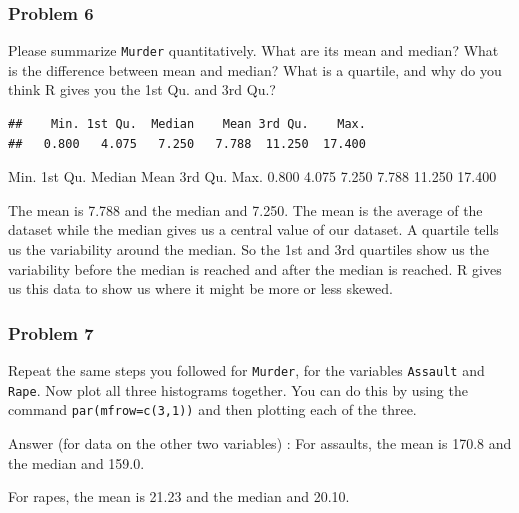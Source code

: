 \documentclass[
]{article}
\newenvironment{Shaded}{\begin{snugshade}}{\end{snugshade}}
\newcommand{\FunctionTok}[1]{\textcolor[rgb]{0.00,0.00,0.00}{#1}}
\newcommand{\NormalTok}[1]{#1}
\newcommand{\SpecialCharTok}[1]{\textcolor[rgb]{0.00,0.00,0.00}{#1}}
\begin{document}
\hypertarget{problem-6}{%
\subsubsection{Problem 6}\label{problem-6}}

Please summarize \texttt{Murder} quantitatively. What are its mean and
median? What is the difference between mean and median? What is a
quartile, and why do you think R gives you the 1st Qu. and 3rd Qu.?

\begin{Shaded}
\end{Shaded}

\begin{verbatim}
##    Min. 1st Qu.  Median    Mean 3rd Qu.    Max. 
##   0.800   4.075   7.250   7.788  11.250  17.400
\end{verbatim}

Min. 1st Qu. Median Mean 3rd Qu. Max. 0.800 4.075 7.250 7.788 11.250
17.400

The mean is 7.788 and the median and 7.250. The mean is the average of
the dataset while the median gives us a central value of our dataset. A
quartile tells us the variability around the median. So the 1st and 3rd
quartiles show us the variability before the median is reached and after
the median is reached. R gives us this data to show us where it might be
more or less skewed.

\hypertarget{problem-7}{%
\subsubsection{Problem 7}\label{problem-7}}

Repeat the same steps you followed for \texttt{Murder}, for the
variables \texttt{Assault} and \texttt{Rape}. Now plot all three
histograms together. You can do this by using the command
\texttt{par(mfrow=c(3,1))} and then plotting each of the three.

Answer (for data on the other two variables) : For assaults, the mean is
170.8 and the median and 159.0.

For rapes, the mean is 21.23 and the median and 20.10.

\begin{Shaded}
\end{Shaded}
\end{document}
